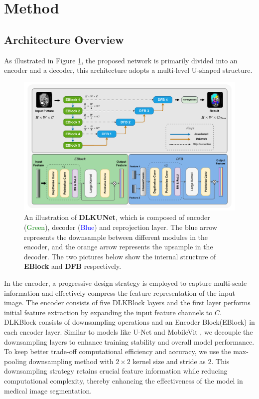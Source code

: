 \documentclass[sn-mathphys-num]{sn-jnl}
\theoremstyle{thmstyleone}%
\theoremstyle{thmstyletwo}%
\theoremstyle{thmstylethree}%
\begin{document}
\section{Method}\label{sec3}

\subsection{Architecture Overview}\label{subsec1}
As illustrated in Figure \ref{fig1}, the proposed network is primarily divided into an encoder and a decoder, this architecture adopts a multi-level U-shaped structure.

\begin{figure}[ht]
    \centering
    \includegraphics[width=\textwidth]{figure1.pdf}
    \caption{An illustration of \textbf{DLKUNet}, which is composed of encoder (\textcolor{green}{Green}), decoder (\textcolor{blue}{Blue}) and reprojection layer.
    The blue arrow represents the downsample between different modules in the encoder, and the orange arrow represents the upsample in the decoder.
    The two pictures below show the internal structure of \textbf{EBlock} and \textbf{DFB} respectively.}\label{fig1}
\end{figure}

In the encoder, a progressive design strategy is employed to capture multi-scale information and effectively compress the feature representation of the input image.
The encoder consists of five DLKBlock layers and the first layer performs initial feature extraction by expanding the input feature channels to \(C\).
DLKBlock consists of downsampling operations and an Encoder Block(EBlock) in each encoder layer.
Similar to models like U-Net \cite{ronneberger2015u} and MobileVit \cite{howard2017mobilenets}, we decouple the downsampling layers to enhance training stability and overall model performance.
To keep better trade-off computational efficiency and accuracy, we use the max-pooling downsampling method with \(2\times 2\) kernel size and stride as \(2\).
This downsampling strategy retains crucial feature information while reducing computational complexity, thereby enhancing the effectiveness of the model in medical image segmentation.
\end{document}
